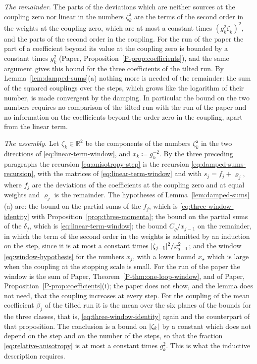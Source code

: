 \documentclass[11pt]{preprint}
\DeclarePairedDelimiter{\abs}{\lvert}{\rvert}
\numberwithin{equation}{section}
\theoremstyle{definition}
\theoremstyle{remark}
\theoremstyle{plain}
\begin{document}
\emph{The remainder.} The parts of the deviations which are neither sources at the coupling zero nor linear in the numbers $\zeta^{\mathsf a}_k$ are the terms of the second order in the weights at the coupling zero, which are at most a constant times $(g_k^2\zeta_k)^2$, and the parts of the second order in the coupling. For the run of the paper the part of a coefficient beyond its value at the coupling zero is bounded by a constant times $g_k^2$ (Paper, Proposition~\ref{P-prop:coefficients}), and the same argument gives this bound for the three coefficients of the tilted run. By Lemma~\ref{lem:damped-sums}(a) nothing more is needed of the remainder: the sum of the squared couplings over the steps, which grows like the logarithm of their number, is made convergent by the damping. In particular the bound on the two numbers requires no comparison of the tilted run with the run of the paper and no information on the coefficients beyond the order zero in the coupling, apart from the linear term.

\emph{The assembly.} Let $\zeta_k \in \mathbb R^2$ be the components of the numbers $\zeta^{\mathsf a}_k$ in the two directions of \eqref{eq:linear-term-window}, and $x_k \coloneqq g_k^{-2}$. By the three preceding paragraphs the recursion \eqref{eq:anisotropy-step} is the recursion \eqref{eq:damped-sums-recursion}, with the matrices of \eqref{eq:linear-term-window} and with $s_j = f_j + \varrho_j$, where $f_j$ are the deviations of the coefficients at the coupling zero and at equal weights and $\varrho_j$ is the remainder. The hypotheses of Lemma~\ref{lem:damped-sums}(a) are: the bound on the partial sums of the $f_j$, which is \eqref{eq:three-window-identity} with Proposition~\ref{prop:three-momenta}; the bound on the partial sums of the $\delta_j$, which is \eqref{eq:linear-term-window}; the bound $C_\varrho/x_{j-1}$ on the remainder, in which the term of the second order in the weights is admitted by an induction on the step, since it is at most a constant times $\abs{\zeta_{j-1}}^2/x_{j-1}^2$; and the window \eqref{eq:window-hypothesis} for the numbers $x_j$, with a lower bound $x_\star$ which is large when the coupling at the stopping scale is small. For the run of the paper the window is the sum of Paper, Theorem~\ref{P-thm:one-loop-window}, and of Paper, Proposition~\ref{P-prop:coefficients}(i); the paper does not show, and the lemma does not need, that the coupling increases at every step. For the coupling of the mean coefficient $\bar\beta_j$ of the tilted run it is the mean over the six planes of the bounds for the three classes, that is, \eqref{eq:three-window-identity} again and the counterpart of that proposition. The conclusion is a bound on $\abs{\zeta_k}$ by a constant which does not depend on the step and on the number of the steps, so that the fraction \eqref{eq:relative-anisotropy} is at most a constant times $g_k^2$. This is what the inductive description requires.
\end{document}
